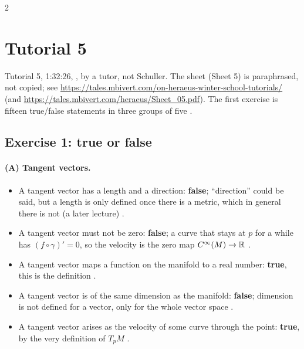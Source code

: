 \begin{paracol}{2}
\section{Tutorial 5}\label{sec:t05-1}

Tutorial 5, 1:32:26, , by a tutor, not Schuller. The sheet (Sheet 5) is paraphrased, not copied; see \url{https://tales.mbivert.com/on-heraeus-winter-school-tutorials/} (and \url{https://tales.mbivert.com/heraeus/Sheet_05.pdf}). The first exercise is fifteen true/false statements in three groups of five .

\subsection*{Exercise 1: true or false}

\paragraph{(A) Tangent vectors.}
\begin{itemize}
  \item A tangent vector has a length and a direction: \textbf{false}; ``direction'' could be said, but a length is only defined once there is a metric, which in general there is not (a later lecture) .
  \item A tangent vector must not be zero: \textbf{false}; a curve that stays at $p$ for a while has $(f\circ\gamma)'=0$, so the velocity is the zero map $C^\infty(M)\to\mathbb{R}$ .
  \item A tangent vector maps a function on the manifold to a real number: \textbf{true}, this is the definition .
  \item A tangent vector is of the same dimension as the manifold: \textbf{false}; dimension is not defined for a vector, only for the whole vector space .
  \item A tangent vector arises as the velocity of some curve through the point: \textbf{true}, by the very definition of $T_pM$ .
\end{itemize}


\end{paracol}
